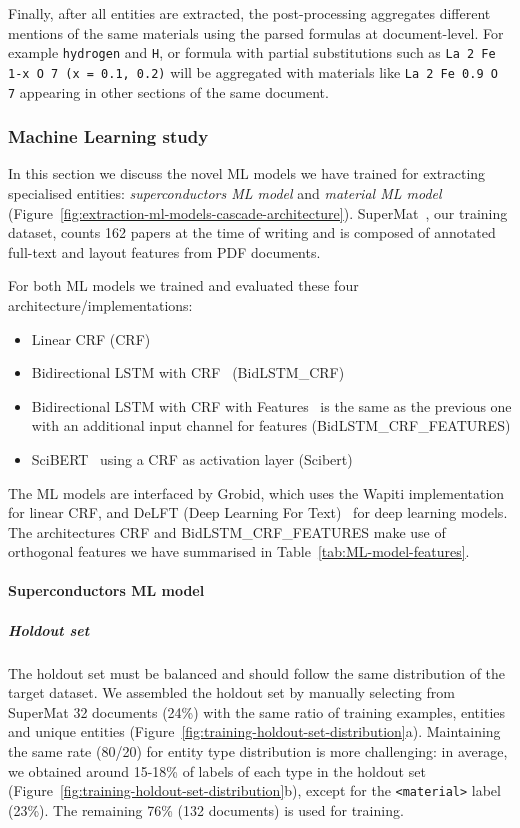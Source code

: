 \documentclass{article}
\begin{document}
Finally, after all entities are extracted, the post-processing aggregates different mentions of the same materials using the parsed formulas at document-level. 
For example \texttt{hydrogen} and \texttt{H}, or formula with partial substitutions such as \texttt{La 2 Fe 1-x O 7 (x = 0.1, 0.2)} will be aggregated with materials like \texttt{La 2 Fe 0.9 O 7} appearing in other sections of the same document. 

\subsubsection{Machine Learning study}

In this section we discuss the novel ML models we have trained for extracting specialised entities: \textit{superconductors ML model} and \textit{material ML model} (Figure~\ref{fig:extraction-ml-models-cascade-architecture}). 
SuperMat~\cite{foppiano2021supermat}, our training dataset, counts 162 papers at the time of writing and is composed of annotated full-text and layout features from PDF documents. 

For both ML models we trained and evaluated these four architecture/implementations: 
\begin{itemize}
    \item Linear CRF (CRF)
    \item Bidirectional LSTM with CRF~\cite{Lample2016NeuralAF} (BidLSTM\_CRF)
    \item Bidirectional LSTM with CRF with Features~\cite{Lample2016NeuralAF} is the same as the previous one with an additional input channel for features (BidLSTM\_CRF\_FEATURES)
    \item SciBERT~\cite{Beltagy2019SciBERT} using a CRF as activation layer (Scibert)
\end{itemize}

The ML models are interfaced by Grobid, which uses the Wapiti\cite{lavergne2010practical} implementation for linear CRF, and DeLFT (Deep Learning For Text)~\cite{DeLFT} for deep learning models.
The architectures CRF and BidLSTM\_CRF\_FEATURES make use of orthogonal features we have summarised in Table~\ref{tab:ML-model-features}. 

\paragraph{Superconductors ML model}

\subparagraph{Holdout set}
The holdout set must be balanced and should follow the same distribution of the target dataset. 
We assembled the holdout set by manually selecting from SuperMat 32 documents (24\%) with the same ratio of training examples, entities and unique entities (Figure~\ref{fig:training-holdout-set-distribution}a).
Maintaining the same rate (80/20) for entity type distribution is more challenging: in average, we obtained around 15-18\% of labels of each type in the holdout set (Figure~\ref{fig:training-holdout-set-distribution}b), except for the \texttt{<material>} label (23\%). %
The remaining 76\% (132 documents) is used for training. 
\end{document}
